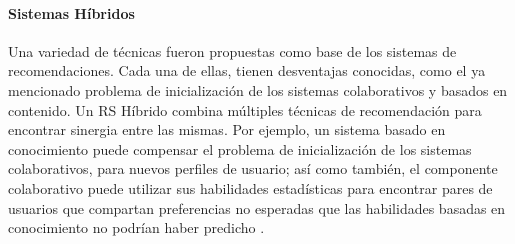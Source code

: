 \paragraph{Sistemas Híbridos}
Una variedad de técnicas fueron propuestas como base de los sistemas de recomendaciones. Cada una de ellas, tienen desventajas conocidas, como el ya mencionado problema de inicialización de los sistemas colaborativos y basados en contenido. Un RS Híbrido combina múltiples técnicas de recomendación para encontrar sinergia entre las mismas. Por ejemplo, un sistema basado en conocimiento puede compensar el problema de inicialización de los sistemas colaborativos, para nuevos perfiles de usuario; así como también, el componente colaborativo puede utilizar sus habilidades estadísticas para encontrar pares de usuarios que compartan preferencias no esperadas que las habilidades basadas en conocimiento no podrían haber predicho \citep{burke2007hybrid}.


